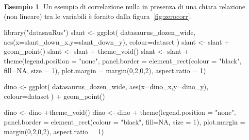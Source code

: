 \documentclass[
  10pt,
  italian,
  a4paper,
  extrafontsizes,onecolumn,openright
  ]{memoir}
\newenvironment{Shaded}{\begin{snugshade}}{\end{snugshade}}
\newcommand{\AttributeTok}[1]{\textcolor[rgb]{0.77,0.63,0.00}{#1}}
\newcommand{\ConstantTok}[1]{\textcolor[rgb]{0.00,0.00,0.00}{#1}}
\newcommand{\DecValTok}[1]{\textcolor[rgb]{0.00,0.00,0.81}{#1}}
\newcommand{\FunctionTok}[1]{\textcolor[rgb]{0.00,0.00,0.00}{#1}}
\newcommand{\NormalTok}[1]{#1}
\newcommand{\OtherTok}[1]{\textcolor[rgb]{0.56,0.35,0.01}{#1}}
\newcommand{\SpecialCharTok}[1]{\textcolor[rgb]{0.00,0.00,0.00}{#1}}
\newcommand{\StringTok}[1]{\textcolor[rgb]{0.31,0.60,0.02}{#1}}
\theoremstyle{definition}
\theoremstyle{definition}
\newtheorem{example}{Esempio}[chapter]
\theoremstyle{definition}
\theoremstyle{definition}
\theoremstyle{remark}
\begin{document}
\begin{example}

Un esempio di correlazione nulla in presenza di una chiara relazione (non lineare) tra le variabili è fornito dalla figura~\ref{fig:zerocorr}.

\begin{Shaded}
\begin{Highlighting}[]
\FunctionTok{library}\NormalTok{(}\StringTok{"datasauRus"}\NormalTok{)}
\NormalTok{slant }\OtherTok{\textless{}{-}} \FunctionTok{ggplot}\NormalTok{(}
\NormalTok{  datasaurus\_dozen\_wide, }
  \FunctionTok{aes}\NormalTok{(}\AttributeTok{x=}\NormalTok{slant\_down\_x,}\AttributeTok{y=}\NormalTok{slant\_down\_y),   }
  \AttributeTok{colour=}\NormalTok{dataset}
\NormalTok{) }
\NormalTok{slant }\OtherTok{\textless{}{-}}\NormalTok{ slant }\SpecialCharTok{+} 
  \FunctionTok{geom\_point}\NormalTok{() }
\NormalTok{slant }\OtherTok{\textless{}{-}}\NormalTok{ slant }\SpecialCharTok{+} 
  \FunctionTok{theme\_void}\NormalTok{() }
\NormalTok{slant }\OtherTok{\textless{}{-}}\NormalTok{ slant }\SpecialCharTok{+} 
  \FunctionTok{theme}\NormalTok{(}\AttributeTok{legend.position =} \StringTok{"none"}\NormalTok{, }
        \AttributeTok{panel.border =} \FunctionTok{element\_rect}\NormalTok{(}\AttributeTok{colour =} \StringTok{"black"}\NormalTok{, }\AttributeTok{fill=}\ConstantTok{NA}\NormalTok{, }\AttributeTok{size =} \DecValTok{1}\NormalTok{),}
        \AttributeTok{plot.margin =} \FunctionTok{margin}\NormalTok{(}\DecValTok{0}\NormalTok{,}\DecValTok{2}\NormalTok{,}\DecValTok{0}\NormalTok{,}\DecValTok{2}\NormalTok{), }\AttributeTok{aspect.ratio =} \DecValTok{1}\NormalTok{) }

\NormalTok{dino }\OtherTok{\textless{}{-}} \FunctionTok{ggplot}\NormalTok{(}
\NormalTok{  datasaurus\_dozen\_wide, }
  \FunctionTok{aes}\NormalTok{(}\AttributeTok{x=}\NormalTok{dino\_x,}\AttributeTok{y=}\NormalTok{dino\_y), }
  \AttributeTok{colour=}\NormalTok{dataset}
\NormalTok{  ) }\SpecialCharTok{+}
  \FunctionTok{geom\_point}\NormalTok{() }

\NormalTok{dino }\OtherTok{\textless{}{-}}\NormalTok{ dino }\SpecialCharTok{+}\FunctionTok{theme\_void}\NormalTok{() }
\NormalTok{dino }\OtherTok{\textless{}{-}}\NormalTok{ dino }\SpecialCharTok{+} 
  \FunctionTok{theme}\NormalTok{(}\AttributeTok{legend.position =} \StringTok{"none"}\NormalTok{, }
        \AttributeTok{panel.border =}  \FunctionTok{element\_rect}\NormalTok{(}\AttributeTok{colour =} \StringTok{"black"}\NormalTok{, }\AttributeTok{fill=}\ConstantTok{NA}\NormalTok{, }\AttributeTok{size =} \DecValTok{1}\NormalTok{),}
        \AttributeTok{plot.margin =} \FunctionTok{margin}\NormalTok{(}\DecValTok{0}\NormalTok{,}\DecValTok{2}\NormalTok{,}\DecValTok{0}\NormalTok{,}\DecValTok{2}\NormalTok{), }\AttributeTok{aspect.ratio =} \DecValTok{1}\NormalTok{) }


\end{Highlighting}
\end{Shaded}
\end{example}
\end{document}

